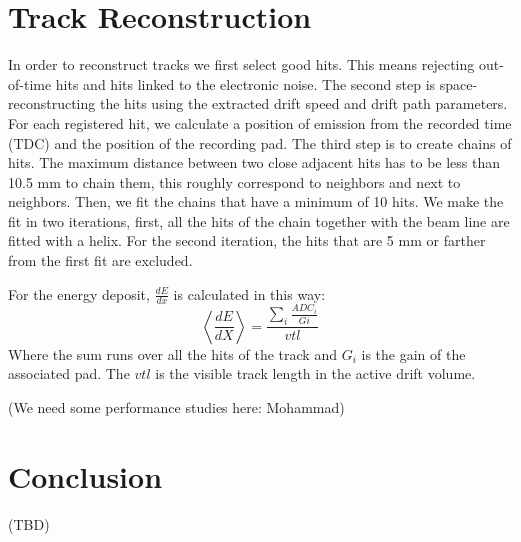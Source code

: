 \documentclass[reprint, amsmath,amssymb, aps]{revtex4}
\begin{document}
\section{Track Reconstruction}

In order to reconstruct tracks we first select good hits. This means rejecting out-of-time hits and hits linked to the electronic noise. The second step is space-reconstructing the hits using the extracted drift speed and drift path parameters. For each registered hit, we calculate a position of emission from the recorded time (TDC) and the position of the recording pad. The third step is to create chains of hits. The maximum distance between two close adjacent hits has to be less than 10.5 mm to chain them, this roughly correspond to neighbors and next to neighbors. Then, we fit the chains that have a minimum of 10 hits. We make the fit in two iterations, first, all the hits of the chain together with the beam line are fitted with a helix. For the second iteration, the hits that are 5 mm or farther from the first fit are excluded.

For the energy deposit, $\frac{dE}{dx}$ is calculated in this way:
\begin{equation}
 \left\langle \frac{dE}{dX} \right\rangle= \frac{\sum\limits_{i} \frac{ADC_{i}}{Gi}}{vtl}
\end{equation}
Where the sum runs over all the hits of the track and $G_{i}$ is the gain of the associated pad. The $vtl$ is the visible track length in the active drift volume. 

(We need some performance studies here: Mohammad)

\section{Conclusion}

(TBD)
\end{document}

